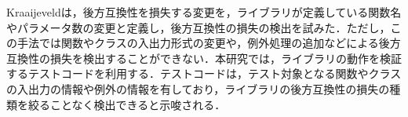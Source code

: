 \documentclass[submit]{ipsj}
\begin{document}
Kraaijeveldは，後方互換性を損失する変更を，ライブラリが定義している関数名やパラメータ数の変更と定義し，後方互換性の損失の検出を試みた\cite{detecting-breaking-changes-in-js-apis}．ただし，この手法では関数やクラスの入出力形式の変更や，例外処理の追加などによる後方互換性の損失を検出することができない．本研究では，ライブラリの動作を検証するテストコードを利用する．テストコードは，テスト対象となる関数やクラスの入出力の情報や例外の情報を有しており，ライブラリの後方互換性の損失の種類を絞ることなく検出できると示唆される．



%
%
\end{document}
